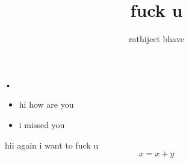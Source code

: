 \documentclass[11pt]{beamer}
\author{rathijeet bhave}
\title{fuck u}
\institute{IITB}
\begin{document}
\begin{frame}
\titlepage
\end{frame}


\begin{frame}{•}
\begin{itemize}
\item hi how are you\\
\item i missed you
\end{itemize}
\end{frame}
\begin{frame}
hii again i want to fuck u
$$x=x+y$$
\end{frame}
\end{document}
